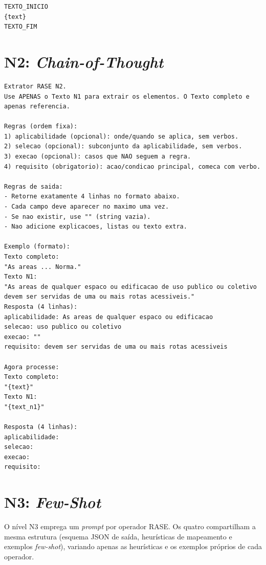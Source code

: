 \begin{apendicesenv}
\begin{lstlisting}[caption={\textit{Prompt} do nível N1 (\textit{Prompt Direct}): \texttt{prompts/n1.txt}.}, label={lst:n1}]
TEXTO_INICIO
{text}
TEXTO_FIM
\end{lstlisting}

\section{N2: \textit{Chain-of-Thought}}

\begin{lstlisting}[caption={\textit{Prompt} do nível N2 (\textit{Chain-of-Thought}): \texttt{prompts/n2.txt}.}, label={lst:n2}]
Extrator RASE N2.
Use APENAS o Texto N1 para extrair os elementos. O Texto completo e apenas referencia.

Regras (ordem fixa):
1) aplicabilidade (opcional): onde/quando se aplica, sem verbos.
2) selecao (opcional): subconjunto da aplicabilidade, sem verbos.
3) execao (opcional): casos que NAO seguem a regra.
4) requisito (obrigatorio): acao/condicao principal, comeca com verbo.

Regras de saida:
- Retorne exatamente 4 linhas no formato abaixo.
- Cada campo deve aparecer no maximo uma vez.
- Se nao existir, use "" (string vazia).
- Nao adicione explicacoes, listas ou texto extra.

Exemplo (formato):
Texto completo:
"As areas ... Norma."
Texto N1:
"As areas de qualquer espaco ou edificacao de uso publico ou coletivo devem ser servidas de uma ou mais rotas acessiveis."
Resposta (4 linhas):
aplicabilidade: As areas de qualquer espaco ou edificacao
selecao: uso publico ou coletivo
execao: ""
requisito: devem ser servidas de uma ou mais rotas acessiveis

Agora processe:
Texto completo:
"{text}"
Texto N1:
"{text_n1}"

Resposta (4 linhas):
aplicabilidade:
selecao:
execao:
requisito:
\end{lstlisting}

\section{N3: \textit{Few-Shot}}

O nível N3 emprega um \textit{prompt} por operador RASE. Os quatro compartilham a mesma estrutura (esquema JSON de saída, heurísticas de mapeamento e exemplos \textit{few-shot}), variando apenas as heurísticas e os exemplos próprios de cada operador.


\end{apendicesenv}
